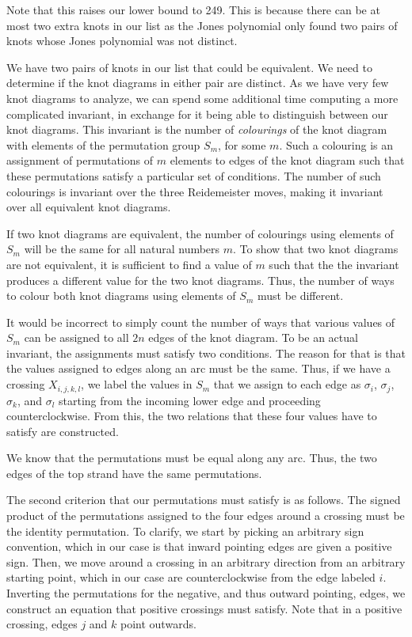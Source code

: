 \begin{paper}
Note that this raises our lower bound to 249.
This is because there can be at most two extra knots in our list as the Jones
polynomial only found two pairs of knots whose Jones polynomial was not
distinct.


We have two pairs of knots in our list that could be equivalent.
We need to determine if the knot diagrams in either pair are distinct.
As we have very few knot diagrams to analyze, we can spend some additional time
computing a more complicated invariant, in exchange for it being able to
distinguish between our knot diagrams.
This invariant is the number of \textit{colourings} of the knot diagram with
elements of the permutation group $S_m$, for some $m$.
Such a colouring is an assignment of permutations of $m$ elements to edges of
the knot diagram such that these permutations satisfy a particular set of
conditions.
The number of such colourings is invariant over the three Reidemeister moves,
making it invariant over all equivalent knot diagrams.

If two knot diagrams are equivalent, the number of colourings using elements of
$S_m$ will be the same for all natural numbers $m$.
To show that two knot diagrams are not equivalent, it is sufficient to find a
value of $m$ such that the the invariant produces a different value for the two
knot diagrams.
Thus, the number of ways to colour both knot diagrams using elements of $S_m$
must be different.

It would be incorrect to simply count the number of ways that various values of
$S_m$ can be assigned to all $2n$ edges of the knot diagram.
To be an actual invariant, the assignments must satisfy two conditions.
The reason for that is that the values assigned to edges along an arc must be
the same.
Thus, if we have a crossing $X_{i,j,k,l}$, we label the values in $S_m$ that we
assign to each edge as $\sigma_i$, $\sigma_j$, $\sigma_k$, and $\sigma_l$
starting from the incoming lower edge and proceeding counterclockwise.
From this, the two relations that these four values have to satisfy are
constructed.

We know that the permutations must be equal along any arc.
Thus, the two edges of the top strand have the same permutations.


The second criterion that our permutations must satisfy is as follows.
The signed product of the permutations assigned to the four edges around a
crossing must be the identity permutation.
To clarify, we start by picking an arbitrary sign convention, which in our case
is that inward pointing edges are given a positive sign.
Then, we move around a crossing in an arbitrary direction from an arbitrary
starting point, which in our case are counterclockwise from the edge labeled
$i$.
Inverting the permutations for the negative, and thus outward pointing, edges,
we construct an equation that positive crossings must satisfy.
Note that in a positive crossing, edges $j$ and $k$ point outwards.


\end{paper}
